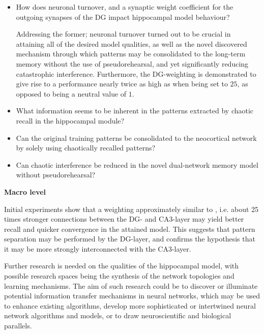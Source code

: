 \begin{itemize}
    \item How does neuronal turnover, and a synaptic weight coefficient for the outgoing synapses of the DG impact hippocampal model behaviour?
    
    Addressing the former; neuronal turnover turned out to be crucial in attaining all of the desired model qualities, as well as the novel discovered mechanism through which patterns may be consolidated to the long-term memory without the use of pseudorehearsal, and yet significantly reducing catastrophic interference.
    Furthermore, the DG-weighting is demonstrated to give rise to a performance nearly twice as high as when being set to $25$, as opposed to being a neutral value of $1$.
    
    \item What information seems to be inherent in the patterns extracted by chaotic recall in the hippocampal module?
    \item Can the original training patterns be consolidated to the neocortical network by solely using chaotically recalled patterns?
    \item Can chaotic interference be reduced in the novel dual-network memory model without pseudorehearsal?
\end{itemize}




\newpage
\textbf{Macro level}

Initial experiments show that a weighting approximately similar to \citep{Wakagi2008}, i.e. about 25 times stronger connections between the DG- and CA3-layer may yield better recall and quicker convergence in the attained model. This suggests that pattern separation may be performed by the DG-layer, and confirms the hypothesis that it may be more strongly interconnected with the CA3-layer.

Further research is needed on the qualities of the hippocampal model, with possible research spaces being the synthesis of the network topologies and learning mechanisms. The aim of such research could be to discover or illuminate potential information transfer mechanisms in neural networks, which may be used to enhance existing algorithms, develop more sophisticated or intertwined neural network algorithms and models, or to draw neuroscientific and biological parallels.

